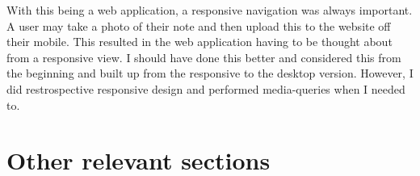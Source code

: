 With this being a web application, a responsive navigation was always important. A user may take a photo of their note and then upload this to the website off their mobile. This resulted in the web application having to be thought about from a responsive view. I should have done this better and considered this from the beginning and built up from the responsive to the desktop version. However, I did restrospective responsive design and performed media-queries when I needed to. 

\section{Other relevant sections}